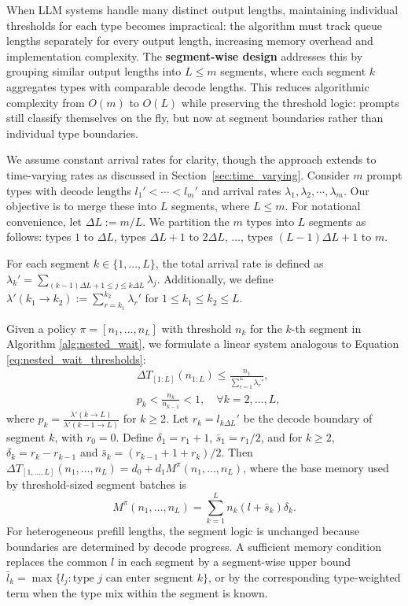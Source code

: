 When LLM systems handle many distinct output lengths, maintaining individual thresholds for each type becomes impractical: the algorithm must track queue lengths separately for every output length, increasing memory overhead and implementation complexity. The \textbf{segment-wise design} addresses this by grouping similar output lengths into $L \leq m$ segments, where each segment $k$ aggregates types with comparable decode lengths. This reduces algorithmic complexity from $O(m)$ to $O(L)$ while preserving the threshold logic: prompts still classify themselves on the fly, but now at segment boundaries rather than individual type boundaries.

We assume constant arrival rates for clarity, though the approach extends to time-varying rates as discussed in Section~\ref{sec:time_varying}. Consider $m$ prompt types with decode lengths $l_1' < \cdots < l_m'$ and arrival rates $\lambda_1, \lambda_2, \cdots, \lambda_m$. Our objective is to merge these into $L$ segments, where $L \leq m$. For notational convenience, let $\Delta L:= m/L$. We partition the $m$ types into $L$ segments as follows: types $1$ to $\Delta L$, types $\Delta L+ 1$ to $2\Delta L$, $\dots$, types $(L-1)\Delta L+ 1$ to $m$.

For each segment $k \in \{1, \dots, L\}$, the total arrival rate is defined as $\lambda_k' = \sum_{(k-1)\Delta L+1\le j\le k\Delta L} \lambda_j$. Additionally, we define $\lambda'(k_1 \to k_2) := \sum_{r=k_1}^{k_2} \lambda_r'$ for $1 \leq k_1 \leq k_2 \leq L$.

Given a policy $\pi=[n_1,\dots,n_L]$ with threshold $n_k$ for the $k$-th segment in Algorithm \ref{alg:nested_wait}, we formulate a linear system analogous to Equation \eqref{eq:nested_wait_thresholds}:
\begin{equation}          \label{eq:nested_wait_thresholds_L}
    \begin{aligned}
    &\Delta T_{[1:L]}(n_{1:L}) \leq \frac{n_1}{\sum_{r=1}^L \lambda_r'},  \\
    &p_k < \frac{n_k}{n_{k-1}} < 1,\quad \forall k=2,\dots,L,
    \end{aligned}
\end{equation}
where $p_k =\frac{\lambda'(k \to L)}{\lambda'(k-1 \to L)}$ for \(k\ge2\). Let \(r_k=l_{k\Delta L}'\) be the decode boundary of segment \(k\), with \(r_0=0\). Define \(\delta_1=r_1+1\), \(\bar s_1=r_1/2\), and for \(k\ge2\), \(\delta_k=r_k-r_{k-1}\) and \(\bar s_k=(r_{k-1}+1+r_k)/2\). Then \(\Delta T_{[1,\dots,L]}(n_1,\dots,n_L)=d_0+d_1M^\pi(n_1,\dots,n_L)\), where the base memory used by threshold-sized segment batches is
\[
M^{\pi}(n_1, \dots, n_L) = \sum_{k=1}^L n_k (l+\bar s_k)\delta_k.
\]
For heterogeneous prefill lengths, the segment logic is unchanged because boundaries are determined by decode progress. A sufficient memory condition replaces the common \(l\) in each segment by a segment-wise upper bound \(\bar l_k=\max\{l_j: \text{type }j\text{ can enter segment }k\}\), or by the corresponding type-weighted term when the type mix within the segment is known.

